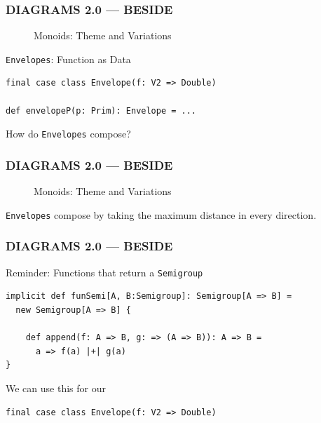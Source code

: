 \documentclass{beamer}
\begin{document}
\begin{frame}[fragile] \frametitle{DIAGRAMS 2.0 --- BESIDE}
  \begin{figure}
      \centering
      \caption{Monoids: Theme and Variations}
  \end{figure}

  \vspace{-0.5cm}
  \pause

  \begin{block}{\texttt{Envelopes}: Function as Data}
  \begin{lstlisting}
final case class Envelope(f: V2 => Double)

def envelopeP(p: Prim): Envelope = ...
  \end{lstlisting}
  \vspace{-0.4cm}
  \end{block}

  How do \texttt{Envelopes} compose?
\end{frame}

\begin{frame} \frametitle{DIAGRAMS 2.0 --- BESIDE}
  \begin{figure}
      \centering
      \caption{Monoids: Theme and Variations}
  \end{figure}

  \texttt{Envelopes} compose by taking the maximum distance in every direction.
\end{frame}


\begin{frame}[fragile] \frametitle{DIAGRAMS 2.0 --- BESIDE}
  \begin{block}{Reminder: Functions that return a \texttt{Semigroup}}
  \begin{lstlisting}
implicit def funSemi[A, B:Semigroup]: Semigroup[A => B] =
  new Semigroup[A => B] {

    def append(f: A => B, g: => (A => B)): A => B =
      a => f(a) |+| g(a)
}
  \end{lstlisting}
  \end{block}

  We can use this for our

  \texttt{final case class Envelope(f: V2 => Double)}
\end{frame}
\end{document}
